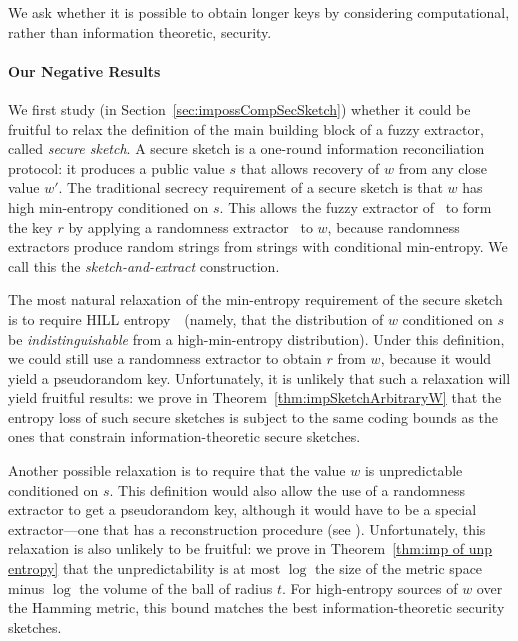 \documentclass[11pt]{article}
\newcommand{\secref}[1]{\mbox{Section~\ref{#1}}}
\newcommand{\thref}[1]{\mbox{Theorem~\ref{#1}}}
\begin{document}
We ask whether it is possible to obtain longer keys by considering
computational, rather than information theoretic, security.

\paragraph {Our Negative Results}
We first study (in  \secref{sec:impossCompSecSketch}) whether it could be fruitful to relax the definition of the main building block of a fuzzy extractor, called \emph{secure sketch}.  A secure sketch is a one-round information reconciliation protocol: it  produces a public value $s$ that allows recovery of $w$ from any close value $w'$.  The traditional secrecy requirement of a secure sketch is that $w$ has high min-entropy conditioned on $s$.  This allows the fuzzy extractor of~\cite{DBLP:journals/siamcomp/DodisORS08}  to form the key $r$ by applying a randomness extractor~\cite{nisan1993randomness} to $w$, because randomness extractors produce random strings from strings with conditional min-entropy. We call this the \emph{sketch-and-extract} construction.

The most natural relaxation of the min-entropy requirement of the secure sketch is to require HILL entropy~\cite{DBLP:journals/siamcomp/HastadILL99}~(namely, that the distribution of $w$ conditioned on $s$ be \emph{indistinguishable} from a high-min-entropy distribution).  Under this definition, we could still use a randomness extractor to obtain $r$ from $w$, because it would yield a pseudorandom key.  Unfortunately, it is unlikely that such a relaxation will yield fruitful results: we prove in Theorem~\ref{thm:impSketchArbitraryW} that the entropy loss of such secure sketches is subject to the same coding bounds as the ones that constrain information-theoretic secure sketches.  

Another possible relaxation is to require that the value $w$ is unpredictable conditioned on $s$. This definition would also allow the use of a randomness extractor to get a pseudorandom key, although it would have to be a special extractor---one that has  a reconstruction procedure (see \cite[Lemma 6]{DBLP:conf/eurocrypt/HsiaoLR07}).  Unfortunately, this relaxation is also unlikely to be fruitful:  we prove in \thref{thm:imp of unp entropy} that the unpredictability is at most $\log$ the size of the metric space minus $\log$ the volume of the ball of radius $t$.  For high-entropy sources of $w$ over the Hamming metric, this bound matches the best information-theoretic security sketches.
\end{document}
